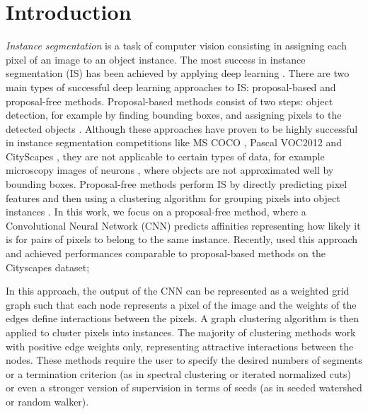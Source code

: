 
\section{Introduction}

\emph{Instance segmentation} is a task of computer vision consisting in assigning each pixel of an image to an object instance. %
The most success in instance segmentation (IS) has been achieved by applying deep learning \cite{he2017mask,romera2016recurrent,liu2018affinity}. There are two main types of successful deep learning approaches to IS: proposal-based and proposal-free methods. Proposal-based methods consist of two steps: object detection, for example by finding bounding boxes, and assigning pixels to the detected objects \cite{he2017mask,dai2016instance,li2017fully}. Although these approaches have proven to be highly successful in instance segmentation competitions like MS COCO \cite{lin2014microsoft}, Pascal VOC2012 \cite{everingham2010pascal} and CityScapes \cite{cordts2016cityscapes}, they are not applicable to certain types of data, for example microscopy images of neurons \cite{arganda2015crowdsourcing}, where objects are not approximated well by bounding boxes. 
Proposal-free methods perform IS by directly predicting pixel features and then using a clustering algorithm for grouping pixels into object instances . In this work, we focus on a proposal-free method, where a Convolutional Neural Network (CNN) predicts affinities representing how likely it is for pairs of pixels to belong to the same instance. Recently, \cite{liu2018affinity} used this approach and achieved performances comparable to proposal-based methods on the Cityscapes dataset;  

In this approach, the output of the CNN can be represented as a weighted grid graph such that each node represents a pixel of the image and the weights of the edges define interactions between the pixels. A graph clustering algorithm is then applied to cluster pixels into instances. The majority of clustering methods work with positive edge weights only, representing attractive interactions between the nodes. These methods require the user to specify the desired numbers of segments or a termination criterion (as in spectral clustering or iterated normalized cuts) or even a stronger version of supervision in terms of seeds (as in seeded watershed or random walker).  

